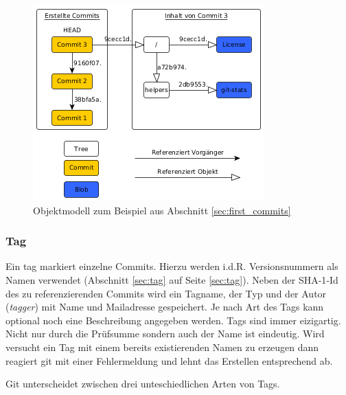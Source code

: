 \begin{figure}[hb]
  \centering
  \includegraphics[scale=0.75]{images/objectmodel.png}
  \caption{Objektmodell zum Beispiel aus Abschnitt \ref{sec:first_commits}\cite[S.~53]{gitosp}}
  \label{fig:objectmodel}
\end{figure}

\subsubsection{Tag}\label{sec:tagobject}
Ein \gls{tag} markiert einzelne Commits. Hierzu werden i.d.R. Versionsnummern
als Namen verwendet (Abschnitt \ref{sec:tag} auf Seite \ref{sec:tag}). Neben
der \gls{SHA-1}-Id des zu referenzierenden Commits wird ein Tagname, der Typ
und der Autor (\textit{tagger}) mit Name und Mailadresse gespeichert. Je nach
Art des Tags kann optional noch eine Beschreibung angegeben werden. Tags sind
immer eizigartig. Nicht nur durch die Prüfsumme sondern auch der Name ist
eindeutig. Wird versucht ein Tag mit einem bereits existierenden Namen zu
erzeugen dann reagiert git mit einer Fehlermeldung und lehnt das Erstellen
entsprechend ab. 

Git unterscheidet zwischen drei unteschiedlichen Arten von Tags.

